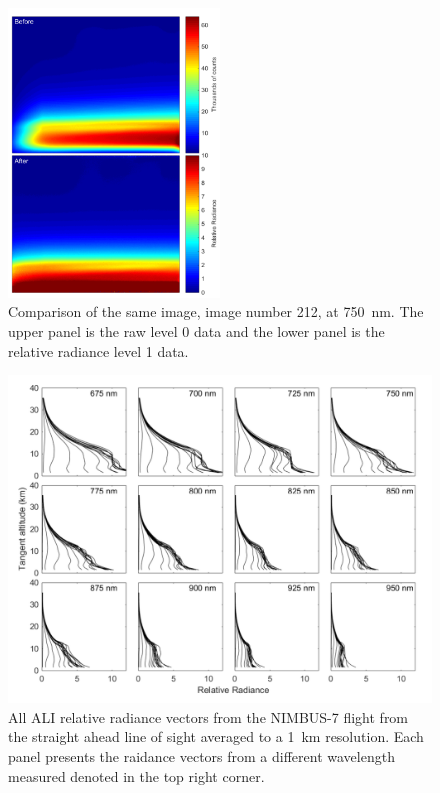 \documentclass[12pt]{article}
\begin{document}
\newpage

\begin{figure}
\includegraphics[width=0.5\textwidth]{./Images/5-2-BeforeAfterImage.pdf}
    \caption{Comparison of the same image, image number 212, at 750~nm. The upper panel is the raw level 0 data and the lower panel is the relative radiance level 1 data.}
    \label{fig:BeforeAfterImages}
\end{figure}

\newpage

\begin{figure}
\includegraphics[width=1.0\textwidth]{./Images/5-2-AliRadianceVectors.pdf}
    \caption{All ALI relative radiance vectors from the NIMBUS-7 flight from the straight ahead line of sight averaged to a 1~km resolution. Each panel presents the raidance vectors from a different wavelength measured denoted in the top right corner. }
    \label{fig:AliRadiancesVectors}
\end{figure}
\end{document}

